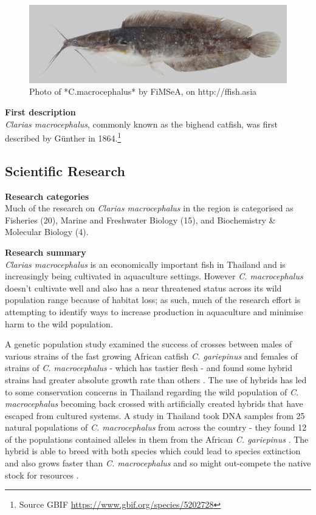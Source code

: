 \documentclass[]{book}
\theoremstyle{definition}
\theoremstyle{definition}
\theoremstyle{definition}
\theoremstyle{remark}
\begin{document}
\begin{figure}

{\centering \includegraphics[width=14.22in]{images_species/152_Clarias_macrocephalus_CTU-P00116} 

}

\caption{Photo of *C.macrocephalus* by FiMSeA, on http://ffish.asia}\label{fig:unnamed-chunk-2}
\end{figure}

\textbf{First description}\\
\emph{Clarias macrocephalus}, commonly known as the bighead catfish, was
first described by Günther in 1864.\footnote{Source GBIF
  \url{https://www.gbif.org/species/5202728}}

\hypertarget{scientific-research}{%
\subsection{Scientific Research}\label{scientific-research}}

\textbf{Research categories}\\
Much of the research on \emph{Clarias macrocephalus} in the region is
categorised as Fisheries (20), Marine and Freshwater Biology (15), and
Biochemistry \& Molecular Biology (4).

\textbf{Research summary}\\
\emph{Clarias macrocephalus} is an economically important fish in
Thailand and is increasingly being cultivated in aquaculture
settings\citep{Na_Nakorn_2004}. However \emph{C. macrocephalus} doesn't
cultivate well and also has a near threatened status across its wild
population range because of habitat loss; as such, much of the research
effort is attempting to identify ways to increase production in
aquaculture and minimise harm to the wild population.

A genetic population study examined the success of crosses between males
of various strains of the fast growing African catfish \emph{C.
gariepinus} and females of strains of \emph{C. macrocephalus} - which
has tastier flesh - and found some hybrid strains had greater absolute
growth rate than others \citep{Koolboon_2014}. The use of hybrids has
led to some conservation concerns in Thailand regarding the wild
population of \emph{C. macrocephalus} becoming back crossed with
artificially created hybrids that have escaped from cultured systems. A
study in Thailand took DNA samples from 25 natural populations of
\emph{C. macrocephalus} from across the country - they found 12 of the
populations contained alleles in them from the African \emph{C.
gariepinus} \citep{Na_Nakorn_2004}. The hybrid is able to breed with
both species which could lead to species extinction and also grows
faster than \emph{C. macrocephalus} and so might out-compete the native
stock for resources \citep{Na_Nakorn_2004}.
\end{document}
